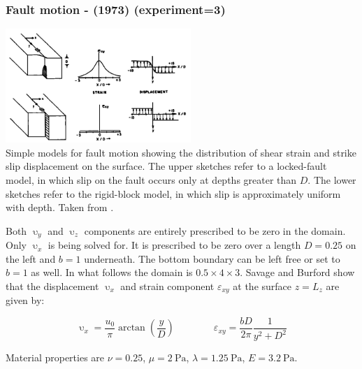 \subsubsection*{Fault motion - \textcite{sabu73} (1973) (experiment=3)}


\begin{center}
\includegraphics[width=7cm]{python_codes/fieldstone_123/images/sabu73}\\
{\captionfont  Simple models for fault motion showing the distribution of shear 
strain and strike slip displacement on the surface. The upper sketches refer to 
a locked-fault model, in which slip on the fault occurs only at depths greater than $D$. 
The lower sketches refer to the rigid-block model, in which slip is approximately uniform with depth.
Taken from \textcite{sabu73}.}
\end{center}

Both $\upupsilon_y$ and $\upupsilon_z$ 
components are entirely prescribed to be zero in the domain. 
Only $\upupsilon_x$ is being solved for. It is prescribed to be zero 
over a length $D=0.25$ on the left and $b=1$ underneath. 
The bottom boundary can be left free or set to $b=1$ as well.
In what follows the domain is $0.5\times 4\times 3$.
Savage and Burford \cite{sabu73} show that the displacement $\upupsilon_x$ 
and strain component ${\varepsilon}_{xy}$ at the surface $z=L_z$ are given by:

\[
\upupsilon_x=\frac{u_0}{\pi} \arctan\left(\frac{y}{D}\right)
\quad\quad
\quad\quad
{\varepsilon}_{xy} = \frac{bD}{2\pi}  \frac{1}{y^2+D^2}
\]

Material properties are $\nu=0.25$, $\mu=\SI{2}{\pascal}$, $\lambda=\SI{1.25}{\pascal}$,
$E=\SI{3.2}{\pascal}$. 

